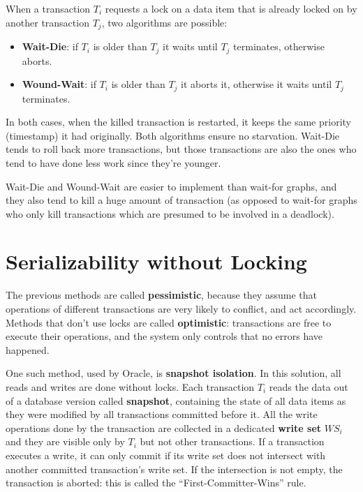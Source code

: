 When a transaction $T_i$ requests a lock on a data item that is already locked on by another transaction $T_j$, two algorithms are possible:
\begin{itemize}
    \item \textbf{Wait-Die}: if $T_i$ is older than $T_j$ it waits until $T_j$ terminates, otherwise aborts.

    \item \textbf{Wound-Wait}: if $T_i$ is older than $T_j$ it aborts it, otherwise it waits until $T_j$ terminates.
\end{itemize}
In both cases, when the killed transaction is restarted, it keeps the same priority (timestamp) it had originally. Both algorithms ensure no starvation. Wait-Die tends to roll back more transactions, but those transactions are also the ones who tend to have done less work since they're younger.

Wait-Die and Wound-Wait are easier to implement than wait-for graphs, and they also tend to kill a huge amount of transaction (as opposed to wait-for graphs who only kill transactions which are presumed to be involved in a deadlock).

\section{Serializability without Locking}

The previous methods are called \textbf{pessimistic}, because they assume that operations of different transactions are very likely to conflict, and act accordingly. Methods that don't use locks are called \textbf{optimistic}: transactions are free to execute their operations, and the system only controls that no errors have happened.

One such method, used by Oracle, is \textbf{snapshot isolation}. In this solution, all reads and writes are done without locks. Each transaction $T_i$ reads the data out of a database version called \textbf{snapshot}, containing the state of all data items as they were modified by all transactions committed before it. All the write operations done by the transaction are collected in a dedicated \textbf{write set} $WS_i$ and they are visible only by $T_i$ but not other transactions. If a transaction executes a write, it can only commit if its write set does not intersect with another committed transaction's write set. If the intersection is not empty, the transaction is aborted: this is called the ``First-Committer-Wins'' rule.

